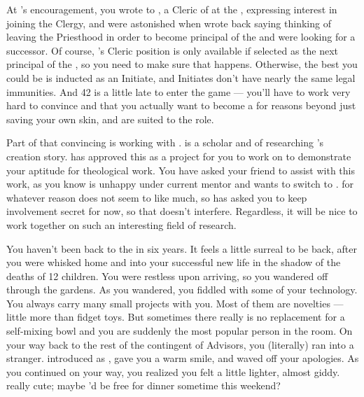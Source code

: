 \documentclass[char]{GL2020}
\begin{document}
At \cScholarship{}’s encouragement, you wrote to \cBeetle{\full}, a Cleric of \cTechGod{} at the \pSchool{}, expressing interest in joining the Clergy, and were astonished when \cBeetle{\they} wrote back saying \cBeetle{\theywere} thinking of leaving the Priesthood in order to become principal of the \pSc{} and were looking for a successor. Of course, \cBeetle{}'s Cleric position is only available if \cBeetle{\theyare} selected as the next principal of the \pSc{}, so you need to make sure that happens. Otherwise, the best you could be is inducted as an Initiate, and Initiates don't have nearly the same legal immunities. And 42 is a little late to enter the game — you'll have to work very hard to convince \cAntiChup{\full} and \cBeetle{} that you actually want to become a \cHeadScientist{\cleric} for reasons beyond just saving your own skin, and are suited to the role. 

Part of that convincing is working with \cEbbPriest{\full}. \cEbbPriest{} is a scholar and \pShippie{} \cEbbPriest{\cleric} of \cEbb{} researching \pEarth{}'s creation story. \cBeetle{} has approved this as a project for you to work on to demonstrate your aptitude for theological work. You have asked your friend \cScholarship{} to assist with this work, as you know \cScholarship{} is unhappy under \cScholarship{\their} current mentor \cAntiChup{} and wants to switch to \cBeetle{}. \cBeetle{} for whatever reason does not seem to like \cScholarship{} much, so \cScholarship{} has asked you to keep \cScholarship{\their} involvement secret for now, so that \cBeetle{} doesn’t interfere. Regardless, it will be nice to work together on such an interesting field of research.

You haven't been back to the \pSc{} in six years. It feels a little surreal to be back, after you were whisked home and into your successful new life in the shadow of the deaths of 12 children. You were restless upon arriving, so you wandered off through the gardens. As you wandered, you fiddled with some of your technology. You always carry many small projects with you. Most of them are novelties — little more than fidget toys. But sometimes there really is no replacement for a self-mixing bowl and you are suddenly the most popular person in the room. On your way back to the rest of the \pTech{} contingent of Advisors, you (literally) ran into a stranger. \cChupAvenger{\They} introduced \cChupAvenger{\themself} as \cChupAvenger{\full}, gave you a warm smile, and waved off your apologies. As you continued on your way, you realized you felt a little lighter, almost giddy. \cChupAvenger{\Theyare} really cute; maybe \cChupAvenger{\they}'d be free for dinner sometime this weekend?
\end{document}

